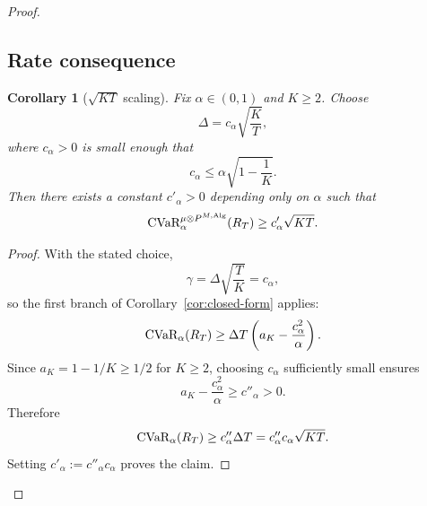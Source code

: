 \documentclass[conference]{IEEEtran}
\newtheorem{corollary}{Corollary}
\begin{document}
\begin{proof}[Proof]
\subsection{Rate consequence}

\begin{corollary}[$\sqrt{KT}$ scaling]
\label{cor:sqrtKT}
Fix $\alpha\in(0,1)$ and $K\ge 2$.
Choose
\[
\Delta = c_\alpha \sqrt{\frac{K}{T}},
\]
where $c_\alpha>0$ is small enough that
\[
c_\alpha \le \alpha\sqrt{1-\frac1K}.
\]
Then there exists a constant $c'_\alpha>0$ depending only on $\alpha$ such that
\[
\textup{CVaR}_\alpha^{\mu\otimes P^{M,\textup{Alg}}}(R_T)
\ge
c'_\alpha \sqrt{KT}.
\]
\end{corollary}

\begin{proof}
With the stated choice,
\[
\gamma = \Delta\sqrt{\frac{T}{K}} = c_\alpha,
\]
so the first branch of Corollary~\ref{cor:closed-form} applies:
\[
\textup{CVaR}_\alpha(R_T)
\ge
\Delta T\left(a_K-\frac{c_\alpha^2}{\alpha}\right).
\]
Since $a_K=1-1/K\ge 1/2$ for $K\ge 2$, choosing $c_\alpha$ sufficiently small ensures
\[
a_K-\frac{c_\alpha^2}{\alpha}\ge c''_\alpha>0.
\]
Therefore
\[
\textup{CVaR}_\alpha(R_T)
\ge
c''_\alpha \Delta T
=
c''_\alpha c_\alpha \sqrt{KT}.
\]
Setting $c'_\alpha:=c''_\alpha c_\alpha$ proves the claim.
\end{proof}


\fi

\end{proof}
\end{document}
